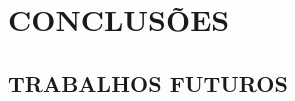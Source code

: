 \chapter{CONCLUSÕES}\label{cap:conclusion}



\section{TRABALHOS FUTUROS}\label{sec:conclusion.1}


